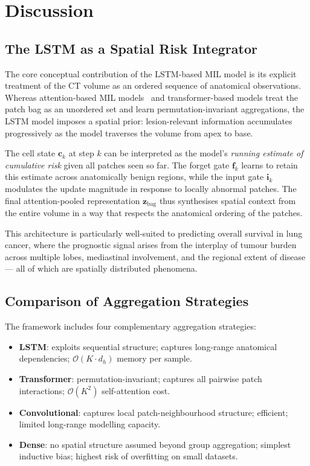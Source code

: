 \documentclass[11pt,a4paper]{article}
\begin{document}
\section{Discussion}
\label{sec:discussion}

\subsection{The LSTM as a Spatial Risk Integrator}

The core conceptual contribution of the LSTM-based MIL model is its explicit
treatment of the CT volume as an ordered sequence of anatomical observations.
Whereas attention-based MIL models~\cite{ilse2018} and transformer-based
models treat the patch bag as an unordered set and learn permutation-invariant
aggregations, the LSTM model imposes a spatial prior: lesion-relevant information
accumulates progressively as the model traverses the volume from apex to base.

The cell state $\mathbf{c}_k$ at step $k$ can be interpreted as the model's
\emph{running estimate of cumulative risk} given all patches seen so far.
The forget gate $\mathbf{f}_k$ learns to retain this estimate across anatomically
benign regions, while the input gate $\mathbf{i}_k$ modulates the update magnitude
in response to locally abnormal patches. The final attention-pooled representation
$\mathbf{z}_{\text{bag}}$ thus synthesises spatial context from the entire volume
in a way that respects the anatomical ordering of the patches.

This architecture is particularly well-suited to predicting overall survival
in lung cancer, where the prognostic signal arises from the interplay of
tumour burden across multiple lobes, mediastinal involvement, and the regional
extent of disease --- all of which are spatially distributed phenomena.

\subsection{Comparison of Aggregation Strategies}

The framework includes four complementary aggregation strategies:
\begin{itemize}
  \item \textbf{LSTM}: exploits sequential structure; captures long-range
        anatomical dependencies; $\mathcal{O}(K \cdot d_h)$ memory per sample.
  \item \textbf{Transformer}: permutation-invariant; captures all pairwise
        patch interactions; $\mathcal{O}(K^2)$ self-attention cost.
  \item \textbf{Convolutional}: captures local patch-neighbourhood structure;
        efficient; limited long-range modelling capacity.
  \item \textbf{Dense}: no spatial structure assumed beyond group aggregation;
        simplest inductive bias; highest risk of overfitting on small datasets.
\end{itemize}
\end{document}
